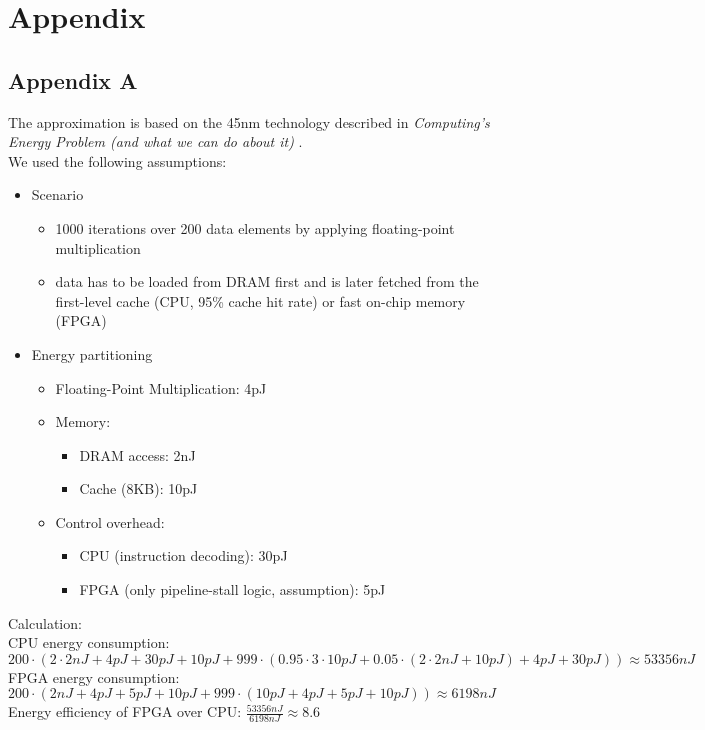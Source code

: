 \chapter{Appendix}

\section*{Appendix A}
The approximation is based on the 45nm technology described in \textit{Computing's Energy Problem (and what we can do about it)} \cite{label1}.
\\
We used the following assumptions:
\begin{itemize}
	\item Scenario
	\begin{itemize}
		\item 1000 iterations over 200 data elements by applying floating-point multiplication
		\item data has to be loaded from DRAM first and is later fetched from the first-level cache (CPU, 95\% cache hit rate) or fast on-chip memory (FPGA)
	\end{itemize}
	\item Energy partitioning
	\begin{itemize}
		\item Floating-Point Multiplication: 4pJ
		\item Memory:
		\begin{itemize}
			\item DRAM access: 2nJ
			\item Cache (8KB): 10pJ
		\end{itemize}
		\item Control overhead:
		\begin{itemize}
			\item CPU (instruction decoding): 30pJ
			\item FPGA (only pipeline-stall logic, assumption): 5pJ
		\end{itemize}
	\end{itemize}
\end{itemize}
Calculation:
\\ 
CPU energy consumption:  $200\cdot(2\cdot2nJ + 4pJ + 30pJ + 10pJ + 999 \cdot (0.95\cdot3\cdot10pJ + 0.05\cdot(2\cdot2nJ + 10pJ) + 4pJ + 30pJ)) \approx 53356nJ$
\\
FPGA energy consumption: $200\cdot(2nJ + 4pJ + 5pJ + 10pJ + 999\cdot(10pJ + 4pJ + 5pJ + 10pJ)) \approx 6198nJ$
\\
Energy efficiency of FPGA over CPU: $\frac{53356nJ}{6198nJ} \approx 8.6$